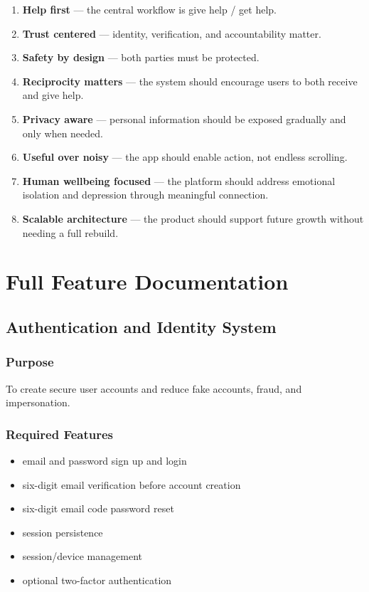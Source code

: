 \documentclass[11pt]{article}
\begin{document}
\begin{enumerate}[leftmargin=1.8em]
    \item \textbf{Help first} --- the central workflow is give help / get help.
    \item \textbf{Trust centered} --- identity, verification, and accountability matter.
    \item \textbf{Safety by design} --- both parties must be protected.
    \item \textbf{Reciprocity matters} --- the system should encourage users to both receive and give help.
    \item \textbf{Privacy aware} --- personal information should be exposed gradually and only when needed.
    \item \textbf{Useful over noisy} --- the app should enable action, not endless scrolling.
    \item \textbf{Human wellbeing focused} --- the platform should address emotional isolation and depression through meaningful connection.
    \item \textbf{Scalable architecture} --- the product should support future growth without needing a full rebuild.
\end{enumerate}

\section{Full Feature Documentation}

\subsection{Authentication and Identity System}

\subsubsection{Purpose}
To create secure user accounts and reduce fake accounts, fraud, and impersonation.

\subsubsection{Required Features}
\begin{itemize}[leftmargin=1.5em]
    \item email and password sign up and login
    \item six-digit email verification before account creation
    \item six-digit email code password reset
    \item session persistence
    \item session/device management
    \item optional two-factor authentication
\end{itemize}
\end{document}
